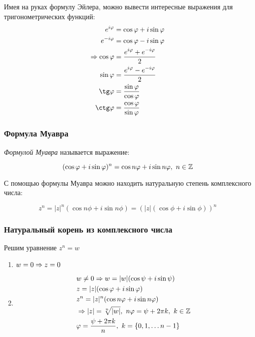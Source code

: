 Имея на руках формулу Эйлера, можно вывести интересные выражения для тригонометрических функций:
\begin{align*}
    e^{i\phi} &= \cos\phi + i \sin\phi
    \\
    e^{-i\phi} &= \cos\phi - i \sin\phi
    \\
    \Ra \cos\phi &= \frac{\dse e^{i\phi} + e^{-i\phi}}{2}
    \\
    \sin\phi &= \frac{\dse e^{i\phi} - e^{-i\phi}}{2}
    \\
    \tg\phi &= \frac{\sin\phi}{\cos\phi}
    \\
    \ctg\phi &= \frac{\cos\phi}{\sin\phi}
\end{align*}

\subsubsection*{Формула Муавра}

\begin{definition}
    \textit{Формулой Муавра} называется выражение:
    
    \[
        (\cos \varphi + i \sin \varphi)^n = \cos n\varphi + i \sin n\varphi,\ n \in \mathbb{Z}
    \]
\end{definition}

С помощью формулы Муавра можно находить натуральную степень комплексного числа:

\[
    z^n = |z|^n (\cos n\phi + i \sin n\phi) = (|z|(\cos \phi + i \sin \phi))^n
\]

\subsubsection*{Натуральный корень из комплексного числа}

Решим уравнение $z^n = w$

\begin{enumerate}
    \item $w = 0 \Rightarrow z = 0$
    \item \begin{align*}
            &w \neq 0 \Rightarrow w = |w|(\cos \psi + i \sin \psi)
            \\
            &z = |z|(\cos \varphi + i \sin \varphi)
            \\
            &z^n = |z|^n(\cos n\varphi + i \sin n\varphi)
            \\
            &\Rightarrow |z| = \sqrt[n]{|w|},\ n\varphi = \psi + 2\pi k,\ k \in \mathbb{Z}
            \\
            &\varphi = \frac{\psi + 2\pi k}{n},\ k = \{0, 1, \dots n - 1\}
        \end{align*}
\end{enumerate}

